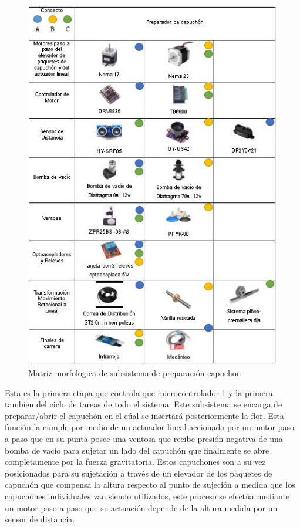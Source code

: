\begin{figure}[H]
	\centering
	\includegraphics{Figuras/MMCapuchon}
	\caption{Matriz morfologica de subsistema de preparación capuchon}
	\label{fig:MMCapuchon}
\end{figure}
Esta es la primera etapa que controla que microcontrolador 1 y la primera tambíen del ciclo de tareas de todo el sistema. Este subsistema se encarga de preparar/abrir el capuchón en el cúal se insertará posteriormente la flor. Esta función la cumple por medio de un actuador lineal accionado por un motor paso a paso que en su punta posee una ventosa que recibe presión negativa de una bomba de vacío para sujetar un lado del capuchón que finalmente se abre completamente por la fuerza gravitatoria. Estos capuchones son a su vez posicionados para su sujetación a través de un elevador de los paquetes de capuchón que compensa la altura respecto al punto de sujeción a medida que los capuchónes individuales van siendo utilizados, este proceso se efectúa mediante un motor paso a paso que su actuación depende de la altura medida por un sensor de distancia. 

